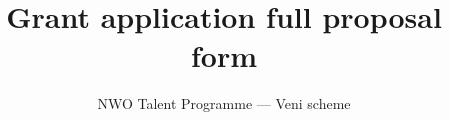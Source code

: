 \documentclass[9.5pt]{Veni}
\title{Grant application full proposal form}
\subtitle{NWO Talent Programme --- Veni scheme}
\begin{document}
\makenwotitle




\end{document}
